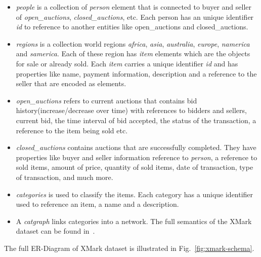 \begin{itemize}	
	\item
	\textit{people} is a collection of \textit{person} element that is connected to buyer and seller of \textit{open\_auctions}, \textit{closed\_auctions}, etc. Each person has an unique identifier \textit{id} to reference to another entities like open\_auctions and closed\_auctions.
	\item
	\textit{regions} is a collection world regions \textit{africa}, \textit{asia}, \textit{australia}, \textit{europe}, \textit{namerica} and \textit{samerica}. Each of these region has \textit{item} elements which are the objects for sale or already sold. Each \textit{item} carries a unique identifier \textit{id} and has properties like name, payment information, description and a reference to the seller that are encoded as elements. 
	\item
		\textit{open\_auctions} refers to current auctions that contains bid history(increase/decrease over time) with references to bidders and sellers, current bid, the time interval of bid accepted, the status of the transaction, a reference to the item being sold etc.
	\item
		\textit{closed\_auctions} contains auctions that are successfully completed. They have properties like buyer and seller information reference to \textit{person}, a reference to sold items, amount of price, quantity of sold items, date of transaction, type of transaction, and much more.
	\item 
		\textit{categories} is used to classify the items. Each category has a unique identifier used to reference an item, a name and a description.
	\item
		  A \textit{catgraph} links categories into a network.  The full semantics of the XMark dataset can be found in~\cite{xmark/original}.
\end{itemize}
The full ER-Diagram of XMark dataset is illustrated in Fig.~\ref{fig:xmark-schema}. 

